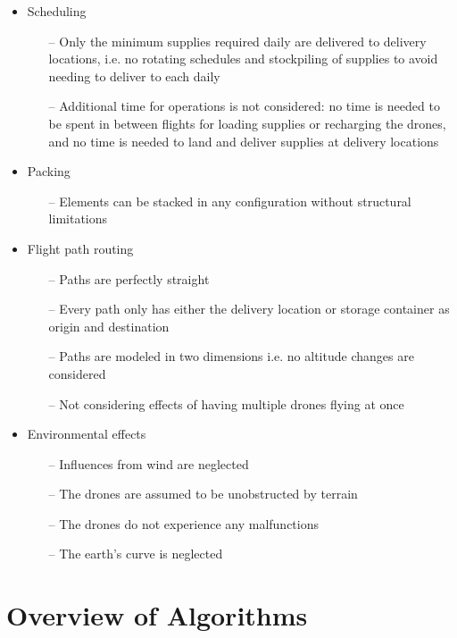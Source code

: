 \documentclass[twocolumn,10pt]{asme2ej}
\begin{document}
\begin{itemize}
	\item Scheduling
	\begin{itemize}
		\item[--] Only the minimum supplies required daily are delivered to delivery locations, i.e. no rotating schedules and stockpiling of supplies to avoid needing to deliver to each daily
		\item[--] Additional time for operations is not considered: no time is needed to be spent in between flights for loading supplies or recharging the drones, and no time is needed to land and deliver supplies at delivery locations
	\end{itemize}
    \item Packing
    \begin{itemize}
    	\item[--] Elements can be stacked in any configuration without structural limitations
    \end{itemize}
	\item Flight path routing
	\begin{itemize}
		\item[--] Paths are perfectly straight
		\item[--] Every path only has either the delivery location or storage container as origin and destination
		\item[--] Paths are modeled in two dimensions i.e. no altitude changes are considered
		\item[--] Not considering effects of having multiple drones flying at once
	\end{itemize}
	\item Environmental effects
	\begin{itemize}
		\item[--] Influences from wind are neglected
		\item[--] The drones are assumed to be unobstructed by terrain
		\item[--] The drones do not experience any malfunctions
		\item[--] The earth’s curve is neglected
	\end{itemize}
\end{itemize}


\section{Overview of Algorithms}
 
 
\end{document}
